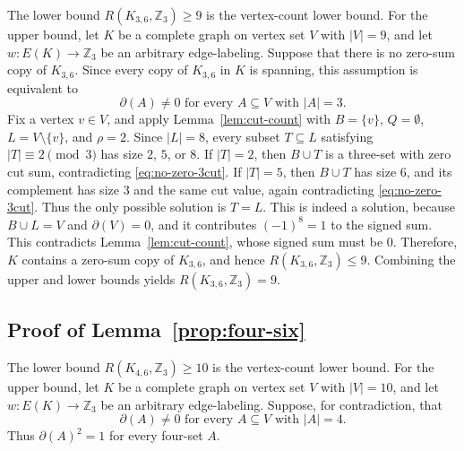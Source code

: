 ﻿\documentclass[11pt]{article}
\numberwithin{equation}{section}
\theoremstyle{remark}
\newcommand{\Z}{\mathbb Z}
\begin{document}
The lower bound $R(K_{3,6},\Z_3)\ge9$ is the vertex-count lower bound.  For the upper bound, let $K$ be a complete graph on vertex set $V$ with $|V|=9$, and let $w\colon E(K)\to\Z_3$ be an arbitrary edge-labeling. Suppose that there is no zero-sum copy of $K_{3,6}$.  Since every copy of \(K_{3,6}\) in \(K\) is spanning, this assumption is equivalent to
\begin{equation}\label{eq:no-zero-3cut}
    \partial(A)\ne0\text{ for every }A\subseteq V\text{ with }|A|=3.
\end{equation}
Fix a vertex $v\in V$, and apply Lemma~\ref{lem:cut-count} with $B=\{v\}$, $Q=\emptyset$, $L=V\setminus\{v\}$, and $\rho=2$.  Since \(|L|=8\), every subset \(T\subseteq L\) satisfying \(|T|\equiv 2\pmod 3\) has size \(2\), \(5\), or \(8\).  If $|T|=2$, then $B\cup T$ is a three-set with zero cut sum, contradicting \eqref{eq:no-zero-3cut}.  If $|T|=5$, then $B\cup T$ has size $6$, and its complement has size $3$ and the same cut value, again contradicting \eqref{eq:no-zero-3cut}.  Thus the only possible solution is $T=L$.  This is indeed a solution, because $B\cup L=V$ and $\partial(V)=0$, and it contributes $(-1)^8=1$ to the signed sum.  This contradicts Lemma~\ref{lem:cut-count}, whose signed sum must be $0$.  Therefore, \(K\) contains a zero-sum copy of \(K_{3,6}\), and hence
\(R(K_{3,6},\Z_3)\le 9.\)
Combining the upper and lower bounds yields
\(R(K_{3,6},\Z_3)=9.\)


\subsection{Proof of Lemma~\ref{prop:four-six}}\label{subsec:prop46}

The lower bound $R(K_{4,6},\Z_3)\ge10$ is the vertex-count lower bound.  For the upper bound, let $K$ be a complete graph on vertex set $V$ with $|V|=10$, and let $w\colon E(K)\to\Z_3$ be an arbitrary edge-labeling. Suppose, for contradiction, that
\begin{equation}\label{eq:k10-no-fourcut}
    \partial(A)\ne0\text{ for every }A\subseteq V\text{ with }|A|=4.
\end{equation}
Thus $\partial(A)^2=1$ for every four-set $A$.
\end{document}
